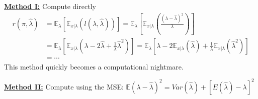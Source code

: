 \documentclass[11pt]{report}
\begin{document}
\underline{\textbf{Method I:}} Compute directly \newline
		\begin{align*}
		r\left(\pi, \widehat{\lambda}\right)
		&  = \mathbb{E}_\lambda\left[\mathbb{E}_{x|\lambda}\left(l(\lambda, \widehat{\lambda})\right) \right] 
		   = \mathbb{E}_\lambda\left[\mathbb{E}_{x|\lambda}\left(\frac{(\lambda-\widehat{\lambda})^2}{\lambda}\right) \right] \\
		&  = \mathbb{E}_\lambda\left[\mathbb{E}_{x|\lambda}\left(\lambda - 2\widehat{\lambda} + \frac{1}{\lambda}\widehat{\lambda}^2 \right) \right] 
		   = \mathbb{E}_\lambda\left[\lambda - 2\mathbb{E}_{x|\lambda}\left(\widehat{\lambda}\right) + \frac{1}{\lambda}\mathbb{E}_{x|\lambda}\left(\widehat{\lambda}^2\right)  \right] \\
		& = \cdots
		\end{align*}
This method quickly becomes a computational nightmare. \newline 


\underline{\textbf{Method II:}} Compute using the MSE: $\mathbb{E}(\lambda-\widehat{\lambda})^2 = Var(\widehat{\lambda}) + [E(\widehat{\lambda}) -\lambda]^2$ 
\end{document}
